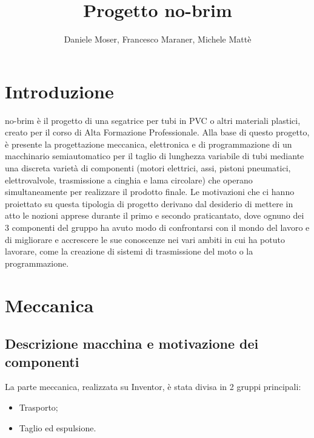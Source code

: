 \documentclass{report}
\title{Progetto no-brim}
\author{Daniele Moser, Francesco Maraner, Michele Mattè}
\begin{document}
\maketitle
\tableofcontents

\chapter{Introduzione}
no-brim è il progetto di una segatrice per tubi in PVC o altri materiali plastici, creato per il corso di Alta Formazione Professionale. Alla base di questo progetto, è presente la progettazione meccanica, elettronica e di programmazione di un macchinario semiautomatico per il taglio di lunghezza variabile di tubi mediante una discreta varietà di componenti (motori elettrici, assi, pistoni pneumatici, elettrovalvole, trasmissione a cinghia e lama circolare) che operano simultaneamente per realizzare il prodotto finale. Le motivazioni che ci hanno proiettato su questa tipologia di progetto derivano dal desiderio di mettere in atto le nozioni apprese durante il primo e secondo praticantato, dove ognuno dei 3 componenti del gruppo ha avuto modo di confrontarsi con il mondo del lavoro e di migliorare e accrescere le sue conoscenze nei vari ambiti in cui ha potuto lavorare, come la creazione di sistemi di trasmissione del moto o la programmazione.
\chapter{Meccanica}

\section{Descrizione macchina e motivazione dei componenti}
La parte meccanica, realizzata su Inventor, è stata divisa in 2 gruppi principali:
\begin{itemize}
\item Trasporto;
\item Taglio ed espulsione.
\end{itemize}
\end{document}
